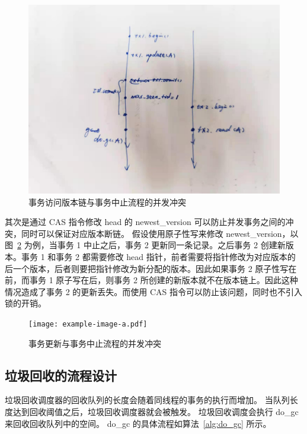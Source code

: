 \begin{figure}
    \centering
    \includegraphics[width=1\linewidth]{figures/read-abort-conflict.jpg}
    \caption{事务访问版本链与事务中止流程的并发冲突}
    \label{fig:update-abort-read}
\end{figure}

其次是通过 CAS 指令修改 head 的 newest\_version 可以防止并发事务之间的冲突，同时可以保证对应版本断链。
假设使用原子性写来修改 newest\_version，以图~\ref{fig:update-abort-update} 为例，当事务 1 中止之后，事务 2 更新同一条记录。之后事务 2 创建新版本。事务 1 和事务 2 都需要修改 head 指针，前者需要将指针修改为对应版本的后一个版本，后者则要把指针修改为新分配的版本。因此如果事务 2 原子性写在前，而事务 1 原子写在后，则事务 2 所创建的新版本就不在版本链上。因此这种情况造成了事务 2 的更新丢失。而使用 CAS 指令可以防止该问题，同时也不引入锁的开销。

\begin{figure}
    \centering
    \texttt{[image: example-image-a.pdf]}
    \caption{事务更新与事务中止流程的并发冲突}
    \label{fig:update-abort-update}
\end{figure}



\subsection{垃圾回收的流程设计}
\label{ssec:gc-implement}

垃圾回收调度器的回收队列的长度会随着同线程的事务的执行而增加。
当队列长度达到回收阈值之后，垃圾回收调度器就会被触发。
垃圾回收调度会执行 do\_gc 来回收回收队列中的空间。
do\_gc 的具体流程如算法~\ref{alg:do_gc} 所示。


